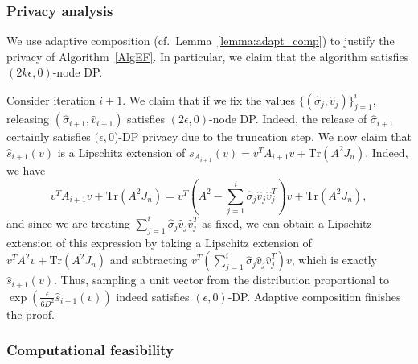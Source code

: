 \documentclass{article}
\newcommand{\Tr}{\ensuremath{\mathrm{Tr}}}
\newcommand{\sigmahat}{\ensuremath{\widehat{\sigma}}}
\begin{document}
\subsubsection{Privacy analysis}

We use adaptive composition (cf.\ Lemma~\ref{lemma:adapt_comp}) to justify the privacy of Algorithm~\ref{AlgEF}. In particular, we claim that the algorithm satisfies $(2k\epsilon, 0)$-node DP.

Consider iteration $i+1$. We claim that if we fix the values $\{(\sigmahat_j, \hat{v}_j)\}_{j=1}^i$, releasing $(\sigmahat_{i+1}, \hat{v}_{i+1})$ satisfies $(2\epsilon, 0)$-node DP. Indeed, the release of $\sigmahat_{i+1}$ certainly satisfies $(\epsilon, 0$)-DP privacy due to the truncation step. We now claim that $\widehat{s}_{i+1}(v)$ is a Lipschitz extension of $s_{A_{i+1}}(v) = v^T A_{i+1} v + \Tr(A^2 J_n)$. Indeed, we have
\begin{equation*}
v^T A_{i+1} v + \Tr(A^2 J_n) = v^T\left(A^2 - \sum_{j=1}^i \sigmahat_j \hat{v}_j \hat{v}_j^T\right) v + \Tr(A^2 J_n),
\end{equation*}
and since we are treating $\sum_{j=1}^i \sigmahat_j \hat{v}_j \hat{v}_j^T$ as fixed, we can obtain a Lipschitz extension of this expression by taking a Lipschitz extension of $v^T A^2 v + \Tr(A^2 J_n)$ and subtracting $v^T \left(\sum_{j=1}^i \sigmahat_j \hat{v}_j \hat{v}_j^T\right) v$, which is exactly $\widehat{s}_{i+1}(v)$. Thus, sampling a unit vector from the distribution proportional to $\exp\left(\frac{\epsilon}{6D^2} \widehat{s}_{i+1}(v)\right)$ indeed satisfies $(\epsilon, 0)$-DP. Adaptive composition finishes the proof.



\subsubsection{Computational feasibility}
\label{SecSampling}
\end{document}
